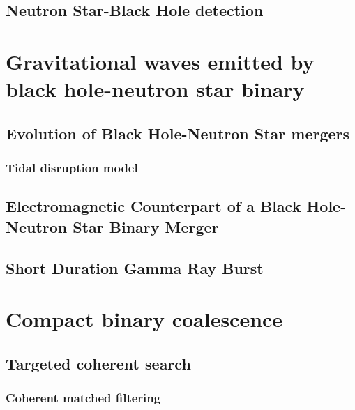 \documentclass[binding=0.6cm, LaM]{sapthesis}
\begin{document}
\section{Neutron Star-Black Hole detection}
\chapter{Gravitational waves emitted by black hole-neutron star binary}



\section{Evolution of Black Hole-Neutron Star mergers}



\subsection{Tidal disruption model}




\section{Electromagnetic Counterpart of a Black Hole-Neutron Star Binary Merger}



\section{Short Duration Gamma Ray Burst}
\chapter{Compact binary coalescence}

\section{Targeted coherent search}


\subsection{Coherent matched filtering}
\end{document}
